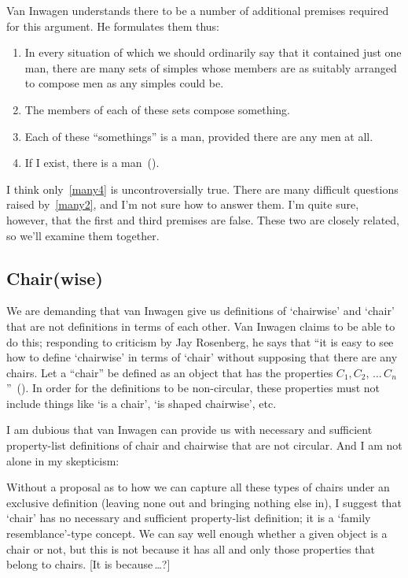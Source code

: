 \documentclass[11pt]{article}
\begin{document}
\begin{spacing}{1}
Van Inwagen understands there to be a number of additional premises
required for this argument.  He formulates them thus:
\begin{enumerate}
	\item In every situation of which we should ordinarily say
          that it contained just one man, there are many sets of
          simples whose members are as suitably arranged to compose
          men as any simples could be.  \label{many1}
	\item The members of each of these sets compose
          something.  \label{many2}
	\item Each of these ``somethings'' is a man, provided there
          are any men at all.  \label{many3}
	\item If I exist, there is a
          man~(\citeyear[216]{inwagen1995}).  \label{many4}
\end{enumerate}
I think only~\ref{many4} is uncontroversially true.  There are many
difficult questions raised by~\ref{many2}, and I'm not sure how to
answer them.  I'm quite sure, however, that the first and third
premises are false.  These two are closely related, so we'll examine
them together.



\subsection{Chair(wise)}
We are demanding that van Inwagen give us definitions of `chairwise'
and `chair' that are not definitions in terms of each other.  Van
Inwagen claims to be able to do this; responding to criticism by Jay
Rosenberg, he says that ``it is easy to see how to define `chairwise'
in terms of `chair' without supposing that there are any chairs.  Let
a ``chair'' be defined as an object that has the properties $C_{1},
C_{2},\,\dots\,C_{n}$''~(\citeyear[719]{inwagen1993b}).  In order for
the definitions to be non-circular, these properties must not include
things like `is a chair', `is shaped chairwise', etc.

I am dubious that van Inwagen can provide us with necessary and
sufficient property-list definitions of chair and chairwise that are
not circular.  And I am not alone in my skepticism:


Without a proposal as to how we can capture all these types of chairs
under an exclusive definition (leaving none out and bringing nothing
else in), I suggest that `chair' has no necessary and sufficient
property-list definition; it is a `family resemblance'-type concept.
We can say well enough whether a given object is a chair or not, but
this is not because it has all and only those properties that belong
to chairs.  [It is because\,\ldots ?]


\end{spacing}
\end{document}
